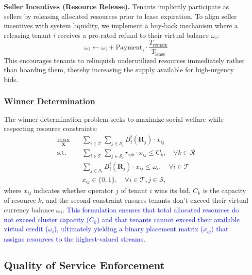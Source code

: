 \documentclass[lettersize,journal]{IEEEtran}
\begin{document}
\textbf{Seller Incentives (Resource Release).} Tenants implicitly participate as sellers by releasing allocated resources prior to lease expiration. To align seller incentives with system liquidity, we implement a buy-back mechanism where a releasing tenant $i$ receives a pro-rated refund to their virtual balance $\omega_i$:
\begin{equation}
\omega_i \leftarrow \omega_i + \text{Payment}_i \cdot \frac{T_{\text{remain}}}{T_{\text{lease}}}
\end{equation}
This encourages tenants to relinquish underutilized resources immediately rather than hoarding them, thereby increasing the supply available for high-urgency bids.

\subsubsection{Winner Determination}
\label{ssub:winner_determination}

The winner determination problem seeks to maximize social welfare while respecting resource constraints:
\begin{align}
\max_{\mathbf{X}} \quad & \sum_{i \in \mathcal{T}} \sum_{j \in \mathcal{S}_i} B_i^t(\mathbf{R}_j) \cdot x_{ij} \\
\text{s.t.} \quad & \sum_{i \in \mathcal{T}} \sum_{j \in \mathcal{S}_i} r_{ijk} \cdot x_{ij} \leq C_k, \quad \forall k \in \mathcal{R} \\
& \sum_{j \in \mathcal{S}_i} B_i^t(\mathbf{R}_j) \cdot x_{ij} \leq \omega_i, \quad \forall i \in \mathcal{T} \\
& x_{ij} \in \{0, 1\}, \quad \forall i \in \mathcal{T}, j \in \mathcal{S}_i
\end{align}
where $x_{ij}$ indicates whether operator $j$ of tenant $i$ wins its bid, $C_k$ is the capacity of resource $k$, and the second constraint ensures tenants don't exceed their virtual currency balance $\omega_i$.
\textcolor{blue}{This formulation ensures that total allocated resources do not exceed cluster capacity ($C_k$) and that tenants cannot exceed their available virtual credit ($\omega_i$), ultimately yielding a binary placement matrix ($x_{ij}$) that assigns resources to the highest-valued streams.}

\subsection{Quality of Service Enforcement}
\label{subsec:qos_enforcement}
\end{document}
